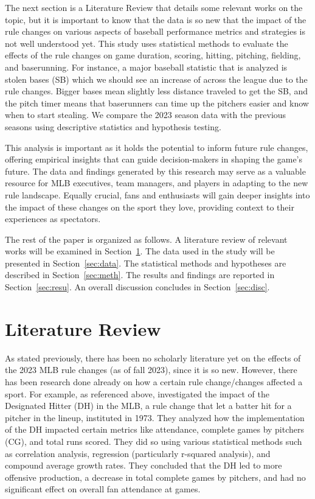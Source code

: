 \documentclass[12pt]{article}
\begin{document}
The next section is a Literature Review that details some relevant works on the
topic, but it is important to know that the data is so new that the impact of the
rule changes on various aspects of baseball performance metrics and strategies 
is not well understood yet. This study uses statistical methods to evaluate the
effects of the rule changes on game duration, scoring, hitting, pitching, fielding,
and baserunning. For instance, a major baseball statistic that is analyzed is
stolen bases (SB) which we should see an increase of across the league due to the
rule changes. Bigger bases mean slightly less distance traveled to get the
SB, and the pitch timer means that baserunners can time up the pitchers easier
and know when to start stealing. We compare the 2023 season data with the previous
seasons using descriptive statistics and hypothesis testing.

This analysis is important as it holds the potential to inform future rule changes,
offering empirical insights that can guide decision-makers in shaping the game's
future. The data and findings generated by this research may serve as a valuable
resource for MLB executives, team managers, and players in adapting to the new
rule landscape. Equally crucial, fans and enthusiasts will gain deeper insights
into the impact of these changes on the sport they love, providing context to
their experiences as spectators.

The rest of the paper is organized as follows.
A literature review of relevant works will be examined in Section~\ref{sec:lit}.
The data used in the study will be presented in Section~\ref{sec:data}.
The statistical methods and hypotheses are described in Section~\ref{sec:meth}.
The results and findings are reported in Section~\ref{sec:resu}.
An overall discussion concludes in Section~\ref{sec:disc}.


\section{Literature Review}
\label{sec:lit}

As stated previously, there has been no scholarly literature yet on the effects
of the 2023 MLB rule changes (as of fall 2023), since it is so new. However,
there has been research done already on how a certain rule change/changes
affected a sport. For example, as referenced above, \citet{Cooley} investigated
the impact of the Designated Hitter (DH) in the MLB, a rule change that let a batter
hit for a pitcher in the lineup, instituted in 1973. They analyzed how the
implementation of the DH impacted certain metrics like attendance, complete games
by pitchers (CG), and total runs scored. They did so using various statistical
methods such as correlation analysis, regression (particularly r-squared analysis),
and compound average growth rates. They concluded that the DH led to more offensive
production, a decrease in total complete games by pitchers, and had no significant
effect on overall fan attendance at games.
\end{document}
